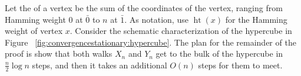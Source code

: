 \documentclass[12pt]{article}
\begin{document}


Let the %
of a vertex be the sum of the coordinates of the vertex, ranging from
Hamming weight \( 0 \) at \( \bar{0} \) to \( n \) at \( \bar{1} \).  As
notation, use \(
\operatorname{ht}
(x) \) for the Hamming weight of vertex \( x \).  Consider the schematic
characterization of the hypercube in Figure~%
\ref{fig:convergencestationary:hypercube}.  The plan for the remainder
of the proof is show that both walks \( X_n \) and \( Y_n \) get to the
bulk of the hypercube in \( \frac{n}{2} \log n \) steps, and then it
takes an additional \( O(n) \) steps for them to meet.
\end{document}
